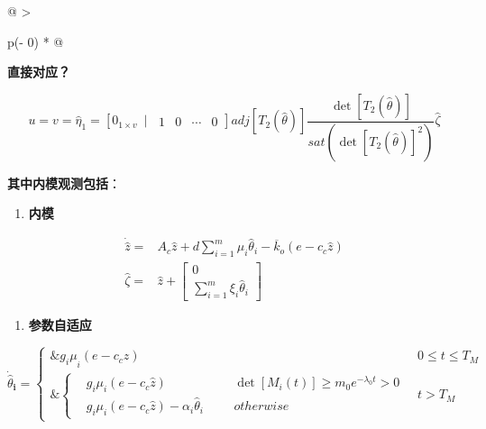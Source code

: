 \documentclass[
  12pt,
  a4paper
]{article}
\begin{document}
\begin{longtable}[]{@{}
  >{\raggedright\arraybackslash}p{}@{}}
\toprule\noalign{}
\begin{minipage}[b]{\linewidth}\raggedright
\textbf{直接对应？}

\[u = v = {\widehat{\eta}}_{1} = \left\lbrack 0_{1 \times v}\ \mid\ \begin{matrix}
1 & 0 & \cdots & 0
\end{matrix} \right\rbrack adj\left\lbrack T_{2}\left( \widehat{\theta} \right) \right\rbrack\frac{\det\left\lbrack T_{2}\left( \widehat{\theta} \right) \right\rbrack}{sat\left( {\det\left\lbrack T_{2}\left( \widehat{\theta} \right) \right\rbrack}^{2} \right)}\widehat{\zeta}\]

\textbf{其中内模观测包括}：

\begin{enumerate}
\def\labelenumi{\arabic{enumi}.}
\item
  \textbf{内模}
\end{enumerate}

\[\begin{aligned}
\dot{\widehat{z}} = & A_{c}\widehat{z} + d\sum_{i = 1}^{m}{\mu_{i}{\widehat{\theta}}_{i}} - {\overline{k}}_{o}\left( e - c_{c}\widehat{z} \right) \\
\widehat{\zeta} = & \widehat{z} + \begin{bmatrix}
0 \\
\sum_{i = 1}^{m}{\xi_{i}{\widehat{\theta}}_{i}}
\end{bmatrix}
\end{aligned}\]

\begin{enumerate}
\def\labelenumi{\arabic{enumi}.}
\setcounter{enumi}{1}
\item
  \textbf{参数自适应}
\end{enumerate}

\[{\dot{\widehat{\theta}}}_{\mathbf{i}}\mathbf{=}\left\{ \begin{aligned}
\mathbf{\&}{g_{i}\mu}_{i}\left( e - c_{c}\widehat{z} \right) & 0 \leq t \leq T_{M} \\
\mathbf{\&}\left\{ \begin{array}{rlrlr}
 & g_{i}\mu_{i}\left( e - c_{c}\widehat{z} \right) & & & \det\left\lbrack M_{i}(t) \right\rbrack \geq m_{0}e^{- \lambda_{0}t} > 0 \\
 & g_{i}\mu_{i}\left( e - c_{c}\widehat{z} \right) - \alpha_{i}{\widehat{\theta}}_{i} & & & otherwise
\end{array} \right.\  & t > T_{M}
\end{aligned} \right.\ \]


\end{minipage}
\end{longtable}
\end{document}
